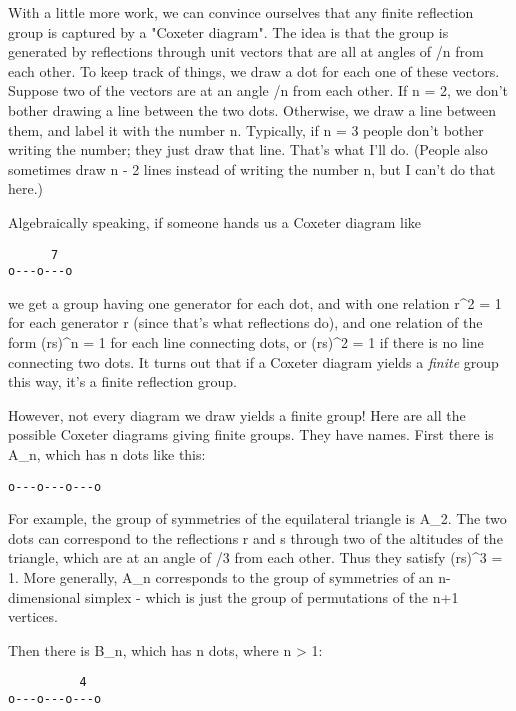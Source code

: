 With a little more work, we can convince ourselves that any finite
reflection group is captured by a "Coxeter diagram".  The
idea is that the group is generated by reflections through unit
vectors that are all at angles of \pi /n from each other.  To keep
track of things, we draw a dot for each one of these vectors.  Suppose
two of the vectors are at an angle \pi /n from each other.  If n = 2,
we don't bother drawing a line between the two dots.  Otherwise, we
draw a line between them, and label it with the number n.  Typically,
if n = 3 people don't bother writing the number; they just draw that
line.  That's what I'll do.  (People also sometimes draw n - 2 lines
instead of writing the number n, but I can't do that here.)

Algebraically speaking, if someone hands us a Coxeter diagram like

\begin{verbatim}
      7
o---o---o
\end{verbatim}
    

we get a group having one generator for each dot, and with one
relation r^{2} = 1 for each generator r (since that's what
reflections do), and one relation of the form (rs)^{n} = 1 for
each line connecting dots, or (rs)^{2} = 1 if there is no line
connecting two dots.  It turns out that if a Coxeter diagram yields a
\emph{finite} group this way, it's a finite reflection group.

However, not every diagram we draw yields a finite group!  Here are
all the possible Coxeter diagrams giving finite groups.  They
have names.  First there is A_{n}, which has n dots like this:

\begin{verbatim}
o---o---o---o
\end{verbatim}
    

For example, the group of symmetries of the equilateral triangle is
A_{2}.  The two dots can correspond to the reflections r and s
through two of the altitudes of the triangle, which are at an angle of
\pi /3 from each other.  Thus they satisfy (rs)^{3} = 1.  
More generally,
A_{n} corresponds to the group of symmetries of an
n-dimensional simplex - which is just the group of permutations of
the n+1 vertices.

Then there is B_{n}, which has n dots, where n > 1:

\begin{verbatim}
          4
o---o---o---o
\end{verbatim}
    

